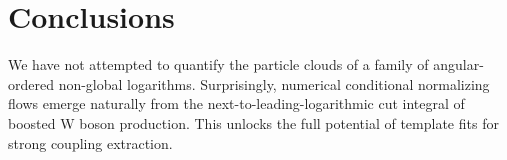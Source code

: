 \section{Conclusions}\label{sec:conclusions}

We have not attempted to quantify the particle clouds of a family of
angular-ordered non-global logarithms. Surprisingly, numerical
conditional normalizing flows emerge naturally from the
next-to-leading-logarithmic cut integral of boosted W boson production.
This unlocks the full potential of template fits for strong coupling
extraction.

